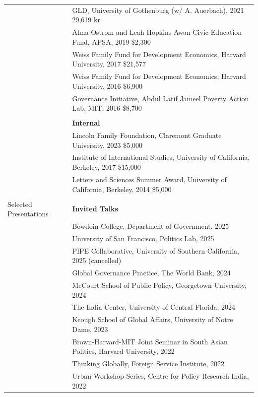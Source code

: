 \documentclass[letterpaper, 10.5pt]{article}
\begin{document}
\begin{longtable}{p{1.5in}p{5in}}
& GLD, University of Gothenburg (w/ A. Auerbach), 2021
\hfill 29,619 kr \\


& Alma Ostrom and Leah Hopkins Awan Civic Education Fund, APSA, 2019 \hfill \$2,300\\



& Weiss Family Fund for Development Economics, Harvard University, 2017
 \hfill \$21,577\\


&Weiss Family Fund for Development Economics, Harvard University, 2016 \hfill \$6,900  \\

&Governance Initiative, Abdul Latif Jameel Poverty Action Lab, MIT, 2016 \hfill \$8,700 \\

& \\

& \textbf{Internal}\\

& Lincoln Family Foundation, Claremont Graduate University, 2023 \hfill \$5,000\\


&Institute of International Studies, University of California, Berkeley, 2017 \hfill \$15,000  \\
& Letters and Sciences Summer Award, University of California, Berkeley, 2014 \hfill \$5,000\\
& \\





{{Selected Presentations}} & \textbf{Invited Talks}\\
&Bowdoin College, Department of Government, 2025\\
& University of San Francisco, Politics Lab, 2025\\
& PIPE Collaborative, University of Southern California, 2025 (cancelled)\\
&Global Governance Practice, The World Bank,  2024\\

&McCourt School of Public Policy, Georgetown University, 2024\\
& The India Center, University of Central Florida, 2024\\
&Keough School of Global Affairs, University of Notre Dame, 2023\\
 &Brown-Harvard-MIT Joint Seminar in South Asian Politics, Harvard University, 2022\\
  &Thinking Globally, Foreign Service Institute, 2022 \\
 &Urban Workshop Series, Centre for Policy Research India, 2022\\


\end{longtable}
\end{document}
